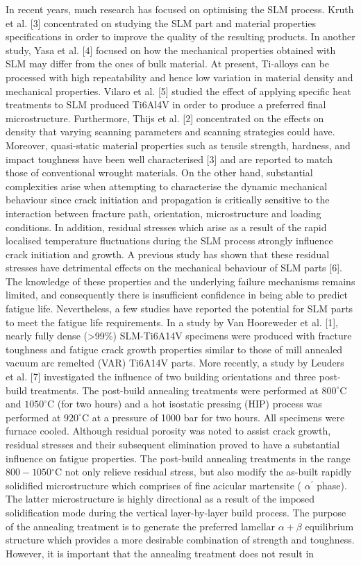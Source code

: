 \documentclass[10pt]{article}
\begin{document}
In recent years, much research has focused on optimising the SLM process. Kruth et al. [3] concentrated on studying the SLM part and material properties specifications in order to improve the quality of the resulting products. In another study, Yasa et al. [4] focused on how the mechanical properties obtained with SLM may differ from the ones of bulk material. At present, Ti-alloys can be processed with high repeatability and hence low variation in material density and mechanical properties. Vilaro et al. [5] studied the effect of applying specific heat treatments to SLM produced Ti6Al4V in order to produce a preferred final microstructure. Furthermore, Thijs et al. [2] concentrated on the effects on density that varying scanning parameters and scanning strategies could have. Moreover, quasi-static material properties such as tensile strength, hardness, and impact toughness have been well characterised [3] and are reported to match those of conventional wrought materials. On the other hand, substantial complexities arise when attempting to characterise the dynamic mechanical behaviour since crack initiation and propagation is critically sensitive to the interaction between fracture path, orientation, microstructure and loading conditions. In addition, residual stresses which arise as a result of the rapid localised temperature fluctuations during the SLM process strongly influence crack initiation and growth. A previous study has shown that these residual stresses have detrimental effects on the mechanical behaviour of SLM parts [6]. The knowledge of these properties and the underlying failure mechanisms remains limited, and consequently there is insufficient confidence in being able to predict fatigue life. Nevertheless, a few studies have reported the potential for SLM parts to meet the fatigue life requirements. In a study by Van Hooreweder et al. [1], nearly fully dense (>99\%) SLM-Ti6A14V specimens were produced with fracture toughness and fatigue crack growth properties similar to those of mill annealed vacuum arc remelted (VAR) Ti6A14V parts. More recently, a study by Leuders et al. [7] investigated the influence of two building orientations and three post-build treatments. The post-build annealing treatments were performed at $800^{\circ} \mathrm{C}$ and $1050^{\circ} \mathrm{C}$ (for two hours) and a hot isostatic pressing (HIP) process was performed at $920^{\circ} \mathrm{C}$ at a pressure of 1000 bar for two hours. All specimens were furnace cooled. Although residual porosity was noted to assist crack growth, residual stresses and their subsequent elimination proved to have a substantial influence on fatigue properties. The post-build annealing treatments in the range $800-1050{ }^{\circ} \mathrm{C}$ not only relieve residual stress, but also modify the as-built rapidly solidified microstructure which comprises of fine acicular martensite ( $\alpha^{\prime}$ phase). The latter microstructure is highly directional as a result of the imposed solidification mode during the vertical layer-by-layer build process. The purpose of the annealing treatment is to generate the preferred lamellar $\alpha+\beta$ equilibrium structure which provides a more desirable combination of strength and toughness. However, it is important that the annealing treatment does not result in 
\end{document}
